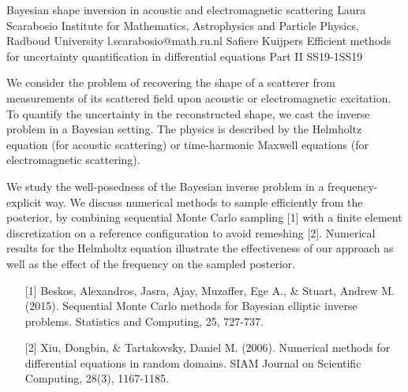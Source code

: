 \begin{talk}
  {Bayesian shape inversion in acoustic and electromagnetic scattering}%
  {Laura Scarabosio}%
  {Institute for Mathematics, Astrophysics and Particle Physics, Radboud University}%
  {l.scarabosio@math.ru.nl}%
  {Safiere Kuijpers}%
{Efficient methods for uncertainty quantification in differential equations Part II}
{}{SS19-1}{SS19}

			
We consider the problem of recovering the shape of a scatterer from measurements of its scattered field upon acoustic or electromagnetic excitation. To quantify the uncertainty in the reconstructed shape, we cast the inverse problem in a Bayesian setting. The physics is described by the Helmholtz equation (for acoustic scattering) or time-harmonic Maxwell equations (for electromagnetic scattering).

\smallskip
We study the well-posedness of the Bayesian inverse problem in a frequency-explicit way. We discuss numerical methods to sample efficiently from the posterior, by combining sequential Monte Carlo sampling [1] with a finite element discretization on a reference configuration to avoid remeshing [2]. Numerical results for the Helmholtz equation illustrate the effectiveness of our approach as well as the effect of the frequency on the sampled posterior.

\begin{enumerate}
	\item[{[1]}] Beskos, Alexandros, Jasra, Ajay, Muzaffer, Ege A., \& Stuart, Andrew M. (2015). Sequential Monte Carlo methods for Bayesian elliptic inverse problems. Statistics and Computing, 25, 727-737.
	
	\item[{[2]}] Xiu, Dongbin, \& Tartakovsky, Daniel M. (2006). Numerical methods for differential equations in random domains. SIAM Journal on Scientific Computing, 28(3), 1167-1185.
\end{enumerate}

\end{talk}

